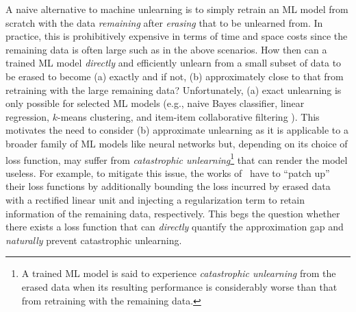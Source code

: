 \documentclass{article}
\theoremstyle{definition}
\begin{document}
A naive alternative to machine unlearning is to simply retrain an ML model from scratch with the data \emph{remaining} after \emph{erasing} that to be unlearned from.
In practice, this is prohibitively expensive in terms of time and space costs since the remaining data is often large such as in the above scenarios.
How then can a trained ML model  \emph{directly} and efficiently unlearn from a small subset of data to be erased to become (a) exactly and if not, (b) approximately close to that from retraining with the large remaining data?
Unfortunately, (a) exact unlearning is only possible for selected ML models (e.g., naive Bayes classifier, linear regression, $k$-means clustering, and item-item collaborative filtering \cite{cao2015towards,ginart2019making,schelteramnesia}).
This motivates the need to consider (b) approximate unlearning as it is applicable to a broader family of ML models like neural networks  \cite{du2019lifelong,golatkar2019eternal} but, depending on its choice of loss function, may suffer from \emph{catastrophic unlearning}\footnote{\label{beef}A trained ML model is said to experience \emph{catastrophic unlearning} from the erased data when its resulting performance is considerably worse than that from retraining with the remaining data.} that can render the model useless.
For example, to mitigate this issue, 
%
%
the works of~\cite{du2019lifelong,golatkar2019eternal} have to ``patch up''
their loss functions by additionally bounding the loss incurred by erased data with a rectified linear unit and injecting a regularization term to retain information of the remaining data, respectively.
This begs the question whether there exists a loss function that can \emph{directly} quantify the approximation gap
and \emph{naturally} prevent catastrophic unlearning.


\end{document}
